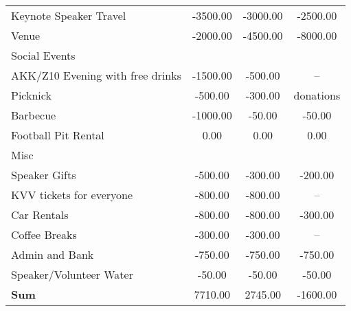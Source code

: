 \begin{tabularx}{\linewidth}{XSSS}
\hspace*{1em} Keynote Speaker Travel  & -3500.00 & -3000.00 & -2500.00\\
\hspace*{1em} Venue  & -2000.00 & -4500.00 & -8000.00\\
\hspace*{1em} Social Events  & {} & {} & {}\\
\hspace*{1em} \hspace*{1em} AKK/Z10 Evening with free drinks & -1500.00 & -500.00 & {–}\\
\hspace*{1em} \hspace*{1em} Picknick & -500.00 & -300.00 & {donations}\\
\hspace*{1em} \hspace*{1em} Barbecue & -1000.00 & -50.00 & -50.00\\
\hspace*{1em} \hspace*{1em} Football Pit Rental & 0.00 & 0.00 & 0.00\\
\hspace*{1em} Misc  & {} & {} & {}\\
\hspace*{1em} \hspace*{1em} Speaker Gifts & -500.00 & -300.00 & -200.00\\
\hspace*{1em} \hspace*{1em} KVV tickets for everyone & -800.00 & -800.00 & {–}\\
\hspace*{1em} \hspace*{1em} Car Rentals & -800.00 & -800.00 & -300.00\\
\hspace*{1em} \hspace*{1em} Coffee Breaks & -300.00 & -300.00 & {–}\\
\hspace*{1em} \hspace*{1em} Admin and Bank & -750.00 & -750.00 & -750.00\\
\hspace*{1em} \hspace*{1em} Speaker/Volunteer Water & -50.00 & -50.00 & -50.00\\[0.5ex]\hline
\bf Sum \hspace*{1em}  & 7710.00 & 2745.00 & -1600.00\\
\end{tabularx}

